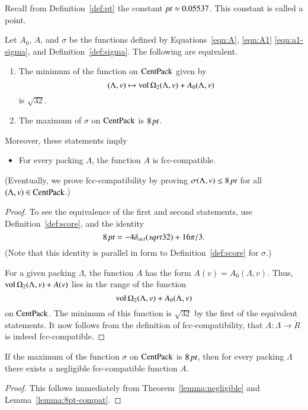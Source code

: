 Recall from Definition~\ref{def:pt} the constant $\hbox{\it pt}\approx
0.05537$.  This constant is called a point.

\begin{lemma}\label{lemma:8pt-compat}
Let $A_0$, $A$, and $\sigma$ be the functions defined by
Equations~\ref{eqn:A}, \ref{eqn:A1}  \ref{eqn:a1-sigma}, and
Definition~\ref{def:sigma}. The following are equivalent.
\begin{enumerate}
  \item The minimum of the function on ${\operatorname{CentPack}}$ given by
      $$(\Lambda,v)\mapsto {\operatorname{vol}}\,\Omega_2(\Lambda,v) + A_0(\Lambda,v)$$
is $\sqrt{32}$.
  \item The maximum of $\sigma$ on ${\operatorname{CentPack}}$ is $8\,\hbox{\it pt}$.
\end{enumerate}
Moreover, these statements imply
\begin{itemize}
  \item For every packing $\Lambda$,
  the function $A$ is
  fcc-compatible.
\end{itemize}
\end{lemma}

(Eventually, we prove fcc-compatibility by proving
$\sigma(\Lambda,v)\le8\,\hbox{\it pt}$ for all $(\Lambda,v)\in{\operatorname{CentPack}}$.)

\begin{proof} To see the equivalence of the first and second statements,
use Definition~\ref{def:score},  and the identity
   $$8\,\hbox{\it pt} = -4\delta_{oct} (sqrt{32}) + 16 \pi/3.$$
(Note that this identity is parallel in form to
Definition~\ref{def:score} for $\sigma$.)

For a given packing $\Lambda$, the function $A$ has the
form $A(v) = A_0(\Lambda,v)$.    Thus,
${\operatorname{vol}}\,\Omega_2(\Lambda,v)+A(v)$ lies in the range of the function
   $${\operatorname{vol}}\,\Omega_2(\Lambda,v) + A_0(\Lambda,v)$$
on ${\operatorname{CentPack}}$.  The minimum of this function is $\sqrt{32}$ by the
first of the equivalent statements.  It now follows from the
definition of fcc-compatibility, that $A:\Lambda\to\ring{R}$ is
indeed fcc-compatible.
\end{proof}

\begin{theorem}\label{lemma:exista}
If the maximum of the function $\sigma$ on
${\operatorname{CentPack}}$ is $8\,\hbox{\it pt}$, then for every packing $\Lambda$
there exists a negligible fcc-compatible function $A$.
\end{theorem}

\begin{proof} This follows immediately from Theorem~\ref{lemma:negligible}
and Lemma~\ref{lemma:8pt-compat}.
\end{proof}


